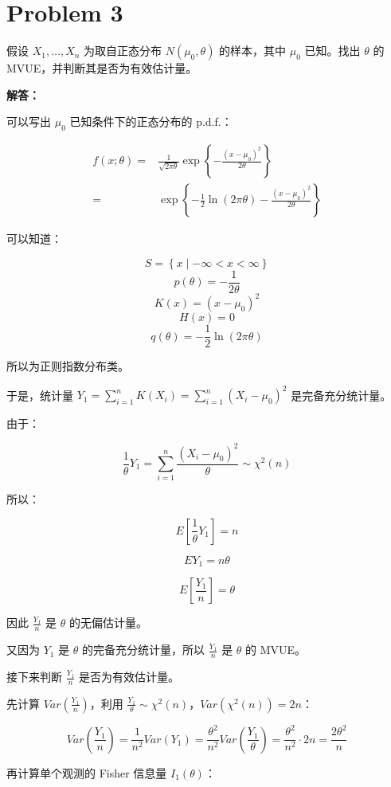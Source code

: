 \documentclass[12pt,a4paper]{article}
\begin{document}
\section{Problem 3}

假设 $X_1,\ldots,X_n$ 为取自正态分布 $N(\mu_0,\theta)$ 的样本，其中 $\mu_0$ 已知。找出 $\theta$ 的 MVUE，并判断其是否为有效估计量。

\begin{answerbox}
\textbf{解答：}

可以写出 $\mu_0$ 已知条件下的正态分布的 p.d.f.：

$$
\begin{aligned}
f(x;\theta) =& \frac{1}{\sqrt{2\pi \theta}} \exp\left\{-\frac{(x-\mu_0)^2}{2\theta}\right\} \\
=& \exp\left\{-\frac{1}{2}\ln(2\pi \theta) - \frac{(x-\mu_0)^2}{2\theta}\right\}
\end{aligned}
$$

可以知道：

$$
S = \left\{x \mid -\infty < x < \infty\right\}
$$
$$
p(\theta) = -\frac{1}{2\theta}
$$
$$
K(x) = (x-\mu_0)^2
$$
$$
H(x) = 0
$$
$$
q(\theta) = -\frac{1}{2}\ln (2 \pi\theta)
$$

所以为正则指数分布类。

于是，统计量 $Y_1 = \sum_{i=1}^{n} K(X_i) = \sum_{i=1}^{n} (X_i-\mu_0)^2$ 是完备充分统计量。

由于：

$$
\frac{1}{\theta}Y_1 = \sum_{i=1}^{n} \frac{(X_i-\mu_0)^2}{\theta} \sim \chi^2(n)
$$

所以：

$$
E\left[\frac{1}{\theta}Y_1 \right] = n
$$

$$
EY_1 = n\theta
$$

$$
E\left[\frac{Y_1}{n}\right] = \theta
$$

因此 $\frac{Y_1}{n}$ 是 $\theta$ 的无偏估计量。

又因为 $Y_1$ 是 $\theta$ 的完备充分统计量，所以 $\frac{Y_1}{n}$ 是 $\theta$ 的 MVUE。

接下来判断 $\frac{Y_1}{n}$ 是否为有效估计量。

先计算 $Var\left(\frac{Y_1}{n}\right)$，利用 $\frac{Y_1}{\theta}\sim\chi^2(n)$，$Var(\chi^2(n))=2n$：

$$
Var\left(\frac{Y_1}{n}\right) = \frac{1}{n^2} Var(Y_1) = \frac{\theta^2}{n^2} Var\left(\frac{Y_1}{\theta}\right) = \frac{\theta^2}{n^2}\cdot 2n = \frac{2\theta^2}{n}
$$

再计算单个观测的 Fisher 信息量 $I_1(\theta)$：


\end{answerbox}
\end{document}
